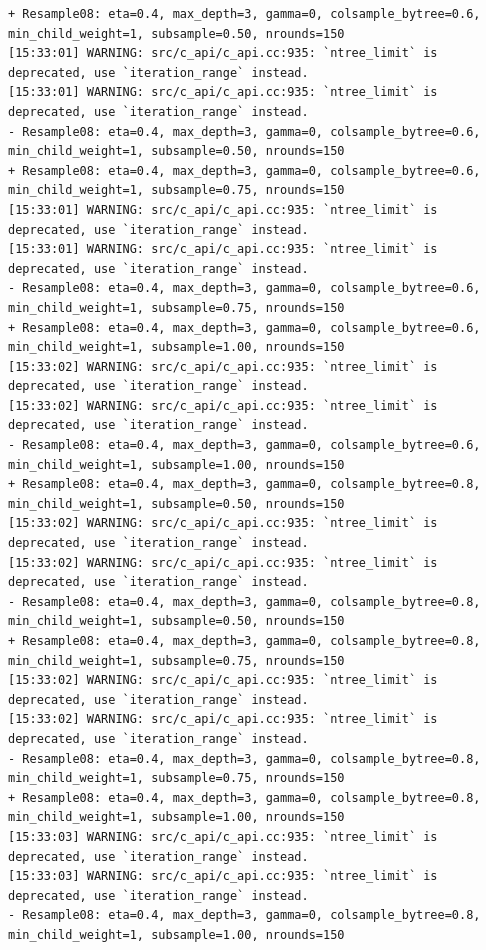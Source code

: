 \documentclass[
  letterpaper,
  DIV=11,
  numbers=noendperiod]{scrartcl}
\begin{document}
\begin{verbatim}
+ Resample08: eta=0.4, max_depth=3, gamma=0, colsample_bytree=0.6, min_child_weight=1, subsample=0.50, nrounds=150 
[15:33:01] WARNING: src/c_api/c_api.cc:935: `ntree_limit` is deprecated, use `iteration_range` instead.
[15:33:01] WARNING: src/c_api/c_api.cc:935: `ntree_limit` is deprecated, use `iteration_range` instead.
- Resample08: eta=0.4, max_depth=3, gamma=0, colsample_bytree=0.6, min_child_weight=1, subsample=0.50, nrounds=150 
+ Resample08: eta=0.4, max_depth=3, gamma=0, colsample_bytree=0.6, min_child_weight=1, subsample=0.75, nrounds=150 
[15:33:01] WARNING: src/c_api/c_api.cc:935: `ntree_limit` is deprecated, use `iteration_range` instead.
[15:33:01] WARNING: src/c_api/c_api.cc:935: `ntree_limit` is deprecated, use `iteration_range` instead.
- Resample08: eta=0.4, max_depth=3, gamma=0, colsample_bytree=0.6, min_child_weight=1, subsample=0.75, nrounds=150 
+ Resample08: eta=0.4, max_depth=3, gamma=0, colsample_bytree=0.6, min_child_weight=1, subsample=1.00, nrounds=150 
[15:33:02] WARNING: src/c_api/c_api.cc:935: `ntree_limit` is deprecated, use `iteration_range` instead.
[15:33:02] WARNING: src/c_api/c_api.cc:935: `ntree_limit` is deprecated, use `iteration_range` instead.
- Resample08: eta=0.4, max_depth=3, gamma=0, colsample_bytree=0.6, min_child_weight=1, subsample=1.00, nrounds=150 
+ Resample08: eta=0.4, max_depth=3, gamma=0, colsample_bytree=0.8, min_child_weight=1, subsample=0.50, nrounds=150 
[15:33:02] WARNING: src/c_api/c_api.cc:935: `ntree_limit` is deprecated, use `iteration_range` instead.
[15:33:02] WARNING: src/c_api/c_api.cc:935: `ntree_limit` is deprecated, use `iteration_range` instead.
- Resample08: eta=0.4, max_depth=3, gamma=0, colsample_bytree=0.8, min_child_weight=1, subsample=0.50, nrounds=150 
+ Resample08: eta=0.4, max_depth=3, gamma=0, colsample_bytree=0.8, min_child_weight=1, subsample=0.75, nrounds=150 
[15:33:02] WARNING: src/c_api/c_api.cc:935: `ntree_limit` is deprecated, use `iteration_range` instead.
[15:33:02] WARNING: src/c_api/c_api.cc:935: `ntree_limit` is deprecated, use `iteration_range` instead.
- Resample08: eta=0.4, max_depth=3, gamma=0, colsample_bytree=0.8, min_child_weight=1, subsample=0.75, nrounds=150 
+ Resample08: eta=0.4, max_depth=3, gamma=0, colsample_bytree=0.8, min_child_weight=1, subsample=1.00, nrounds=150 
[15:33:03] WARNING: src/c_api/c_api.cc:935: `ntree_limit` is deprecated, use `iteration_range` instead.
[15:33:03] WARNING: src/c_api/c_api.cc:935: `ntree_limit` is deprecated, use `iteration_range` instead.
- Resample08: eta=0.4, max_depth=3, gamma=0, colsample_bytree=0.8, min_child_weight=1, subsample=1.00, nrounds=150 

\end{verbatim}
\end{document}

